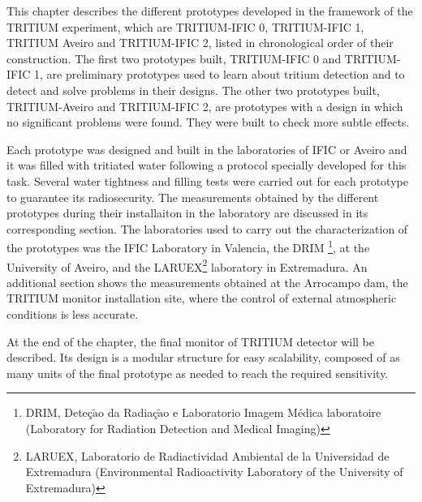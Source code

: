 This chapter describes the different prototypes developed in the framework of the TRITIUM experiment, which are TRITIUM-IFIC 0, TRITIUM-IFIC 1, TRITIUM Aveiro and TRITIUM-IFIC 2, listed in chronological order of their construction. The first two prototypes built, TRITIUM-IFIC 0 and TRITIUM-IFIC 1, are preliminary prototypes used to learn about tritium detection and to detect and solve problems in their designs. The other two prototypes built, TRITIUM-Aveiro and TRITIUM-IFIC 2, are prototypes with a design in which no significant problems were found. They were built to check more subtle effects. 

Each prototype was designed and built in the laboratories of IFIC or Aveiro and it was filled with tritiated water following a protocol specially developed for this task. Several water tightness and filling tests were carried out for each prototype to guarantee its radiosecurity. The measurements obtained by the different prototypes during their installaiton in the laboratory are discussed in its corresponding section. The laboratories used to carry out the characterization of the prototypes was the IFIC Laboratory in Valencia, the DRIM \footnote{DRIM, Deteç$\tilde{\text{a}}$o da Radiaç$\tilde{\text{a}}$o e Laboratorio Imagem Médica laboratoire (Laboratory for Radiation Detection and Medical Imaging)}, at the University of Aveiro, and the LARUEX\footnote{LARUEX, Laboratorio de Radiactividad Ambiental de la Universidad de Extremadura (Environmental Radioactivity Laboratory of the University of Extremadura)} laboratory in Extremadura. An additional section shows the measurements obtained at the Arrocampo dam, the TRITIUM monitor installation site, where the control of external atmospheric conditions is less accurate.

At the end of the chapter, the final monitor of TRITIUM detector will be described. Its design is a modular structure for easy scalability, composed of as many units of the final prototype as needed to reach the required sensitivity.